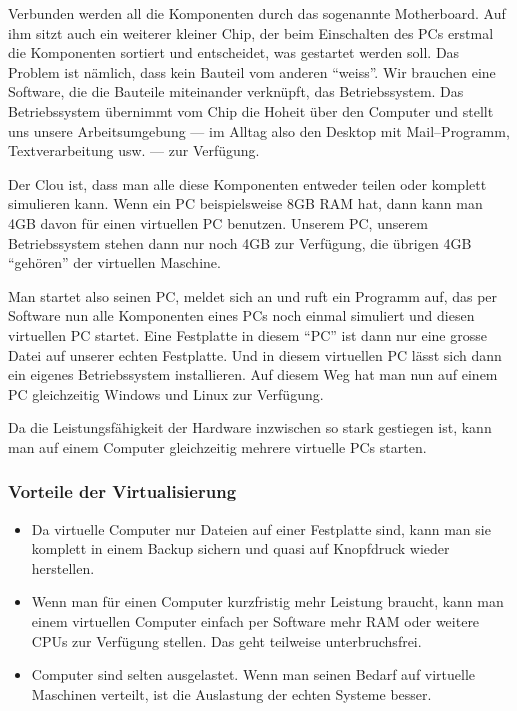       Verbunden werden all die Komponenten durch das sogenannte Motherboard. Auf ihm sitzt auch ein weiterer kleiner Chip, der beim Einschalten des PCs erstmal die Komponenten sortiert und entscheidet, was gestartet werden soll. Das Problem ist nämlich, dass kein Bauteil vom anderen ``weiss''. Wir brauchen eine Software, die die Bauteile miteinander verknüpft, das Betriebssystem. Das Betriebssystem übernimmt vom Chip die Hoheit über den Computer und stellt uns unsere Arbeitsumgebung --- im Alltag also den Desktop mit Mail--Programm, Textverarbeitung usw. --- zur Verfügung.

      Der Clou ist, dass man alle diese Komponenten entweder teilen oder komplett simulieren kann. Wenn ein PC beispielsweise 8GB RAM hat, dann kann man 4GB davon für einen virtuellen PC benutzen. Unserem PC, unserem Betriebssystem stehen dann nur noch 4GB zur Verfügung, die übrigen 4GB ``gehören'' der virtuellen Maschine.

      Man startet also seinen PC, meldet sich an und ruft ein Programm auf, das per Software nun alle Komponenten eines PCs noch einmal simuliert und diesen virtuellen PC startet. Eine Festplatte in diesem ``PC'' ist dann nur eine grosse Datei auf unserer echten Festplatte. Und in diesem virtuellen PC lässt sich dann ein eigenes Betriebssystem installieren. Auf diesem Weg hat man nun auf einem PC gleichzeitig Windows und Linux zur Verfügung.

      Da die Leistungsfähigkeit der Hardware inzwischen so stark gestiegen ist, kann man auf einem Computer gleichzeitig mehrere virtuelle PCs starten.
      
      \begin{frame}
      \frametitle{Vorteile der Virtualisierung}
        \begin{itemize}
          \item Da virtuelle Computer nur Dateien auf einer Festplatte sind, kann man sie komplett in einem Backup sichern und quasi auf Knopfdruck wieder herstellen.
          \item Wenn man für einen Computer kurzfristig mehr Leistung braucht, kann man einem virtuellen Computer einfach per Software mehr RAM oder weitere CPUs zur Verfügung stellen. Das geht teilweise unterbruchsfrei.
          \item Computer sind selten ausgelastet. Wenn man seinen Bedarf auf virtuelle Maschinen verteilt, ist die Auslastung der echten Systeme besser.
        \end{itemize}
      \end{frame}

